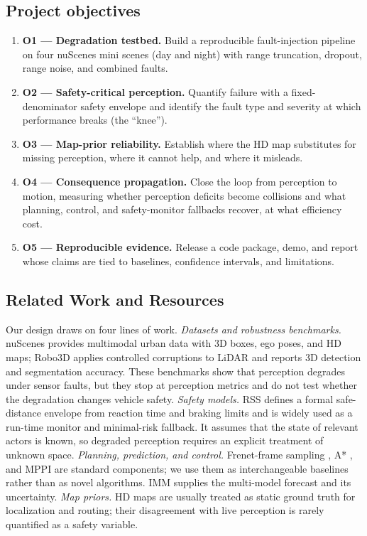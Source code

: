 \documentclass[10pt,a4paper]{article}
\begin{document}
\subsection{Project objectives}

\begin{enumerate}
  \item \textbf{O1 --- Degradation testbed.} Build a reproducible fault-injection pipeline on four nuScenes mini scenes (day and night) with range truncation, dropout, range noise, and combined faults.
  \item \textbf{O2 --- Safety-critical perception.} Quantify failure with a fixed-denominator safety envelope and identify the fault type and severity at which performance breaks (the ``knee'').
  \item \textbf{O3 --- Map-prior reliability.} Establish where the HD map substitutes for missing perception, where it cannot help, and where it misleads.
  \item \textbf{O4 --- Consequence propagation.} Close the loop from perception to motion, measuring whether perception deficits become collisions and what planning, control, and safety-monitor fallbacks recover, at what efficiency cost.
  \item \textbf{O5 --- Reproducible evidence.} Release a code package, demo, and report whose claims are tied to baselines, confidence intervals, and limitations.
\end{enumerate}

\subsection{Related Work and Resources}

Our design draws on four lines of work. \emph{Datasets and robustness benchmarks.} nuScenes \cite{caesar2020} provides multimodal urban data with 3D boxes, ego poses, and HD maps; Robo3D \cite{kong2023} applies controlled corruptions to LiDAR and reports 3D detection and segmentation accuracy. These benchmarks show that perception degrades under sensor faults, but they stop at perception metrics and do not test whether the degradation changes vehicle safety. \emph{Safety models.} RSS \cite{shalev2017} defines a formal safe-distance envelope from reaction time and braking limits and is widely used as a run-time monitor and minimal-risk fallback. It assumes that the state of relevant actors is known, so degraded perception requires an explicit treatment of unknown space. \emph{Planning, prediction, and control.} Frenet-frame sampling \cite{werling2010}, A* \cite{hart1968}, and MPPI \cite{williams2017} are standard components; we use them as interchangeable baselines rather than as novel algorithms. IMM \cite{blom1988} supplies the multi-model forecast and its uncertainty. \emph{Map priors.} HD maps are usually treated as static ground truth for localization and routing; their disagreement with live perception is rarely quantified as a safety variable.
\end{document}
